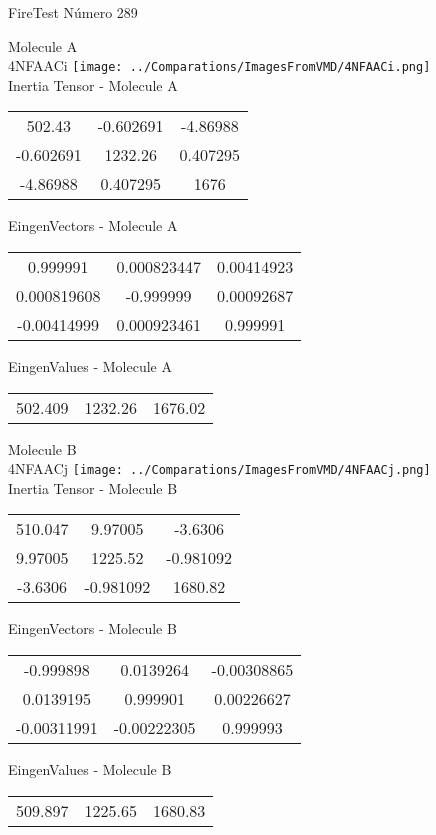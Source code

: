 \vtab[-2cm]
\begin{center}
{\large FireTest \tab Número 289}
\end{center}
\begin{multicols}{2}
\begin{center}

Molecule A \\ 
4NFAACi
\texttt{[image: ../Comparations/ImagesFromVMD/4NFAACi.png]}
\\
Inertia Tensor - Molecule A \\
\vtab

\begin{tabular}{|c c c|}
502.43	 & 	-0.602691	 & 	-4.86988	 \\
-0.602691	 & 	1232.26	 & 	0.407295	 \\
-4.86988	 & 	0.407295	 & 	1676
\end{tabular}

\vtab
 EingenVectors - Molecule A     \\
\vtab
\begin{tabular}{|c c c|}
0.999991	 & 	0.000823447	 & 	0.00414923	 \\
0.000819608	 & 	-0.999999	 & 	0.00092687	 \\
-0.00414999	 & 	0.000923461	 & 	0.999991
\end{tabular}

\vtab
 EingenValues - Molecule A     \\
\vtab
\begin{tabular}{|c c c|}
502.409	 & 	1232.26	 & 	1676.02	 \\
\end{tabular}
\columnbreak

Molecule B \\ 
4NFAACj
\texttt{[image: ../Comparations/ImagesFromVMD/4NFAACj.png]}
\\
Inertia Tensor - Molecule B \\
\vtab

\begin{tabular}{|c c c|}
510.047	 & 	9.97005	 & 	-3.6306	 \\
9.97005	 & 	1225.52	 & 	-0.981092	 \\
-3.6306	 & 	-0.981092	 & 	1680.82
\end{tabular}

\vtab
 EingenVectors - Molecule B     \\
\vtab
\begin{tabular}{|c c c|}
-0.999898	 & 	0.0139264	 & 	-0.00308865	 \\
0.0139195	 & 	0.999901	 & 	0.00226627	 \\
-0.00311991	 & 	-0.00222305	 & 	0.999993
\end{tabular}

\vtab
 EingenValues - Molecule B     \\
\vtab
\begin{tabular}{|c c c|}
509.897	 & 	1225.65	 & 	1680.83	 \\
\end{tabular}

\end{center}
\end{multicols}

